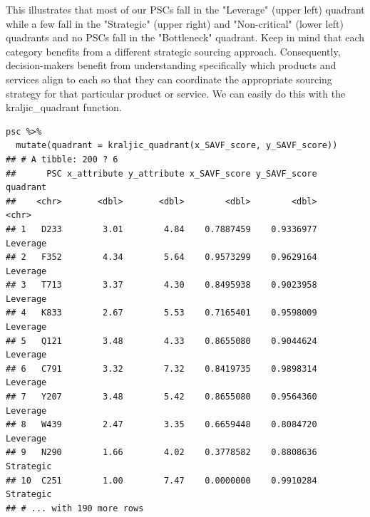 \documentclass[twocolumn]{svjour3}       %
\begin{document}
This illustrates that most of our PSCs fall in the "Leverage" (upper left) quadrant while a few fall in the "Strategic" (upper right) and "Non-critical" (lower left) quadrants and no PSCs fall in the "Bottleneck" quadrant. Keep in mind that each category benefits from a different strategic sourcing approach. Consequently, decision-makers benefit from understanding specifically which products and services align to each so that they can coordinate the appropriate sourcing strategy for that particular product or service. We can easily do this with the kraljic\_quadrant function.
\begin{verbatim}
psc %>%
  mutate(quadrant = kraljic_quadrant(x_SAVF_score, y_SAVF_score))
## # A tibble: 200 ? 6
##      PSC x_attribute y_attribute x_SAVF_score y_SAVF_score  quadrant
##    <chr>       <dbl>       <dbl>        <dbl>        <dbl>     <chr>
## 1   D233        3.01        4.84    0.7887459    0.9336977  Leverage
## 2   F352        4.34        5.64    0.9573299    0.9629164  Leverage
## 3   T713        3.37        4.30    0.8495938    0.9023958  Leverage
## 4   K833        2.67        5.53    0.7165401    0.9598009  Leverage
## 5   Q121        3.48        4.33    0.8655080    0.9044624  Leverage
## 6   C791        3.32        7.32    0.8419735    0.9898314  Leverage
## 7   Y207        3.48        5.42    0.8655080    0.9564360  Leverage
## 8   W439        2.47        3.35    0.6659448    0.8084720  Leverage
## 9   N290        1.66        4.02    0.3778582    0.8808636 Strategic
## 10  C251        1.00        7.47    0.0000000    0.9910284 Strategic
## # ... with 190 more rows
\end{verbatim}
\end{document}
